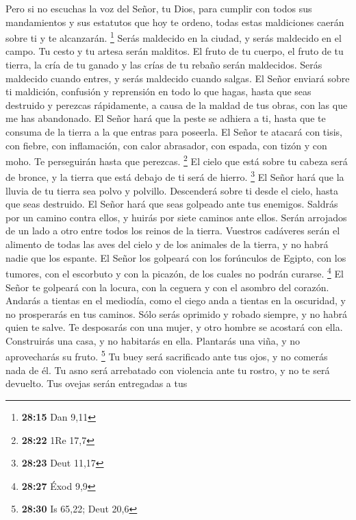 \begin{paracol}{2}
 Pero si no escuchas la voz del Señor, tu Dios, para
cumplir con todos sus mandamientos y sus estatutos que hoy te ordeno,
todas estas maldiciones caerán sobre ti y te alcanzarán. \footnote{\textbf{28:15}
  Dan 9,11}  Serás maldecido en la ciudad, y serás
maldecido en el campo.  Tu cesto y tu artesa serán
malditos.  El fruto de tu cuerpo, el fruto de tu tierra,
la cría de tu ganado y las crías de tu rebaño serán maldecidos.
 Serás maldecido cuando entres, y serás maldecido cuando
salgas.  El Señor enviará sobre ti maldición, confusión y
reprensión en todo lo que hagas, hasta que seas destruido y perezcas
rápidamente, a causa de la maldad de tus obras, con las que me has
abandonado.  El Señor hará que la peste se adhiera a ti,
hasta que te consuma de la tierra a la que entras para poseerla.
 El Señor te atacará con tisis, con fiebre, con
inflamación, con calor abrasador, con espada, con tizón y con moho. Te
perseguirán hasta que perezcas. \footnote{\textbf{28:22} 1Re 17,7}
 El cielo que está sobre tu cabeza será de bronce, y la
tierra que está debajo de ti será de hierro. \footnote{\textbf{28:23}
  Deut 11,17}  El Señor hará que la lluvia de tu tierra
sea polvo y polvillo. Descenderá sobre ti desde el cielo, hasta que seas
destruido.  El Señor hará que seas golpeado ante tus
enemigos. Saldrás por un camino contra ellos, y huirás por siete caminos
ante ellos. Serán arrojados de un lado a otro entre todos los reinos de
la tierra.  Vuestros cadáveres serán el alimento de todas
las aves del cielo y de los animales de la tierra, y no habrá nadie que
los espante.  El Señor los golpeará con los forúnculos de
Egipto, con los tumores, con el escorbuto y con la picazón, de los
cuales no podrán curarse. \footnote{\textbf{28:27} Éxod 9,9}
 El Señor te golpeará con la locura, con la ceguera y con
el asombro del corazón.  Andarás a tientas en el
mediodía, como el ciego anda a tientas en la oscuridad, y no prosperarás
en tus caminos. Sólo serás oprimido y robado siempre, y no habrá quien
te salve.  Te desposarás con una mujer, y otro hombre se
acostará con ella. Construirás una casa, y no habitarás en ella.
Plantarás una viña, y no aprovecharás su fruto. \footnote{\textbf{28:30}
  Is 65,22; Deut 20,6}  Tu buey será sacrificado ante tus
ojos, y no comerás nada de él. Tu asno será arrebatado con violencia
ante tu rostro, y no te será devuelto. Tus ovejas serán entregadas a tus

\end{paracol}

